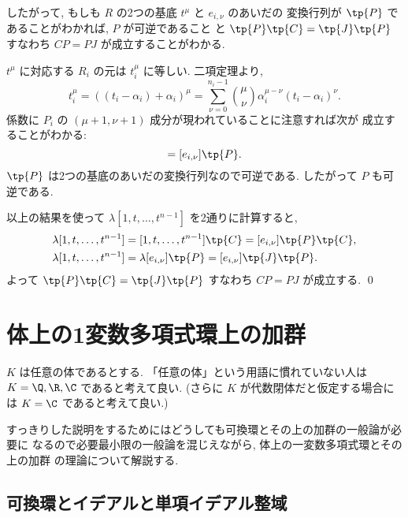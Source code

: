 \documentclass[12pt,twoside]{jarticle}
\begin{document}
したがって, もしも $R$ の2つの基底 $t^\mu$ と $e_{i,\nu}$ のあいだの
変換行列が $\tp{P}$ であることがわかれば, $P$ が可逆であること
と $\tp{P}\tp{C}=\tp{J}\tp{P}$ すなわち $CP=PJ$ が成立することがわかる.

$t^\mu$ に対応する $R_i$ の元は $t_i^\mu$ に等しい.  二項定理より,
\begin{equation*}
  t_i^\mu 
  = ((t_i-\alpha_i) + \alpha_i)^\mu
  = \sum_{\nu=0}^{n_i-1} 
    \binom{\mu}{\nu} \alpha_i^{\mu-\nu} (t_i-\alpha_i)^\nu.
\end{equation*}
係数に $P_i$ の $(\mu+1,\nu+1)$ 成分が現われていることに注意すれば次が
成立することがわかる:
\begin{equation*}
  [1,t,\dots,t^{n-1}] = [e_{i,\nu}]\tp{P}.
\end{equation*}
$\tp{P}$ は2つの基底のあいだの変換行列なので可逆である.
したがって $P$ も可逆である.

以上の結果を使って $\lambda [1,t,\dots,t^{n-1}]$ を2通りに計算すると,
\begin{align*}
  &
  \lambda [1,t,\dots,t^{n-1}] 
  = [1,t,\dots,t^{n-1}] \tp{C}
  = [e_{i,\nu}] \tp{P}\tp{C},
  \\ &
  \lambda [1,t,\dots,t^{n-1}]
  = \lambda [e_{i,\nu}] \tp{P}
  = [e_{i,\nu}] \tp{J}\tp{P}.
\end{align*}
よって $\tp{P}\tp{C}=\tp{J}\tp{P}$ すなわち $CP=PJ$ が成立する.
\qed


\section{体上の1変数多項式環上の加群}
\label{sec:K[x]-module}

$K$ は任意の体であるとする. 
「任意の体」という用語に慣れていない人は $K=\Q,\R,\C$ であると考えて良い.
(さらに $K$ が代数閉体だと仮定する場合には $K=\C$ であると考えて良い.)

すっきりした説明をするためにはどうしても可換環とその上の加群の一般論が必要に
なるので必要最小限の一般論を混じえながら, 体上の一変数多項式環とその上の加群
の理論について解説する.


\subsection{可換環とイデアルと単項イデアル整域}
\label{sec:ring-ideal-PID}
\end{document}
